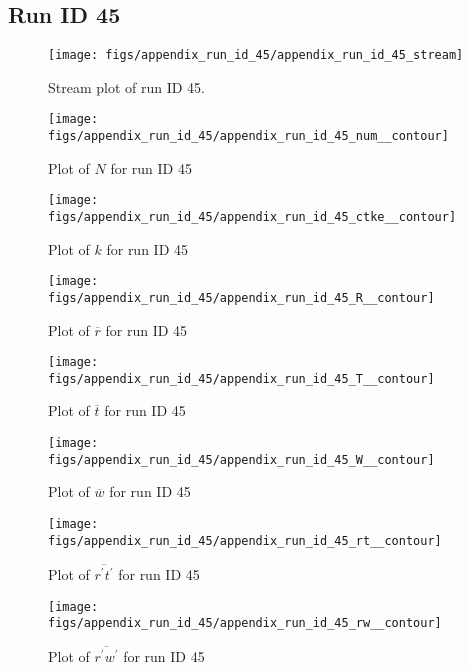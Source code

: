 \subsection{Run ID 45}
\begin{figure}[H]
\centering
\texttt{[image: figs/appendix\_run\_id\_45/appendix\_run\_id\_45\_stream]}
\caption{Stream plot of run ID 45.}
\label{fig:appendix_run_id_45_stream}
\end{figure}


\begin{figure}[H]
\centering
\texttt{[image: figs/appendix\_run\_id\_45/appendix\_run\_id\_45\_num\_\_contour]}
\caption{Plot of $N$ for run ID 45}
\label{fig:appendix_run_id_45_num__contour}
\end{figure}


\begin{figure}[H]
\centering
\texttt{[image: figs/appendix\_run\_id\_45/appendix\_run\_id\_45\_ctke\_\_contour]}
\caption{Plot of $k$ for run ID 45}
\label{fig:appendix_run_id_45_ctke__contour}
\end{figure}


\begin{figure}[H]
\centering
\texttt{[image: figs/appendix\_run\_id\_45/appendix\_run\_id\_45\_R\_\_contour]}
\caption{Plot of $\overline{r}$ for run ID 45}
\label{fig:appendix_run_id_45_R__contour}
\end{figure}


\begin{figure}[H]
\centering
\texttt{[image: figs/appendix\_run\_id\_45/appendix\_run\_id\_45\_T\_\_contour]}
\caption{Plot of $\overline{t}$ for run ID 45}
\label{fig:appendix_run_id_45_T__contour}
\end{figure}


\begin{figure}[H]
\centering
\texttt{[image: figs/appendix\_run\_id\_45/appendix\_run\_id\_45\_W\_\_contour]}
\caption{Plot of $\overline{w}$ for run ID 45}
\label{fig:appendix_run_id_45_W__contour}
\end{figure}


\begin{figure}[H]
\centering
\texttt{[image: figs/appendix\_run\_id\_45/appendix\_run\_id\_45\_rt\_\_contour]}
\caption{Plot of $\overline{r^\prime t^\prime}$ for run ID 45}
\label{fig:appendix_run_id_45_rt__contour}
\end{figure}


\begin{figure}[H]
\centering
\texttt{[image: figs/appendix\_run\_id\_45/appendix\_run\_id\_45\_rw\_\_contour]}
\caption{Plot of $\overline{r^\prime w^\prime}$ for run ID 45}
\label{fig:appendix_run_id_45_rw__contour}
\end{figure}


